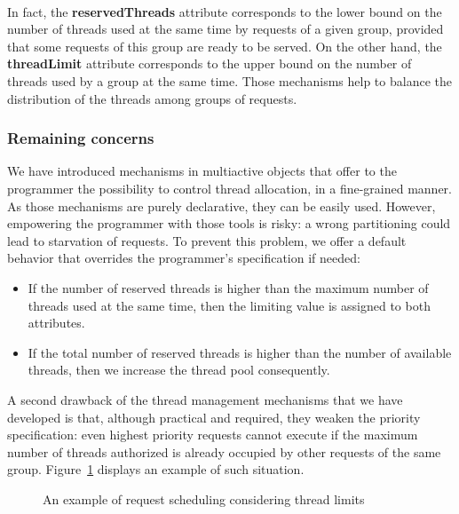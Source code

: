 \documentclass[11pt]{report}
\begin{document}
\paragraph{}
In fact, the \textbf{reservedThreads} attribute corresponds to the lower bound on the number of threads used at the same time by requests of a given group, provided that some requests of this group are ready to be served. On the other hand, the \textbf{threadLimit} attribute corresponds to the upper bound on the number of threads used by a group at the same time. Those mechanisms help to balance the distribution of the threads among groups of requests.

\subsubsection{Remaining concerns}
We have introduced mechanisms in multiactive objects that offer to the programmer the possibility to control thread allocation, in a fine-grained manner. As those mechanisms are purely declarative, they can be easily used. However, empowering the programmer with those tools is risky: a wrong partitioning could lead to starvation of requests. To prevent this problem, we offer a default behavior that overrides the programmer's specification if needed:
\begin{itemize}
\item If the number of reserved threads is higher than the maximum number of threads used at the same time, then the limiting value is assigned to both attributes.
\item If the total number of reserved threads is higher than the number of available threads, then we increase the thread pool consequently.
\end{itemize}
A second drawback of the thread management mechanisms that we have developed is that, although practical and required, they weaken the priority specification: even highest priority requests cannot execute if the maximum number of threads authorized is already occupied by other requests of the same group. Figure~\ref{fig:thread_limit} displays an example of such situation.

\begin{figure}[!ht]
      \caption{An example of request scheduling considering thread limits}
      \label{fig:thread_limit} 
\end{figure}
\end{document}
